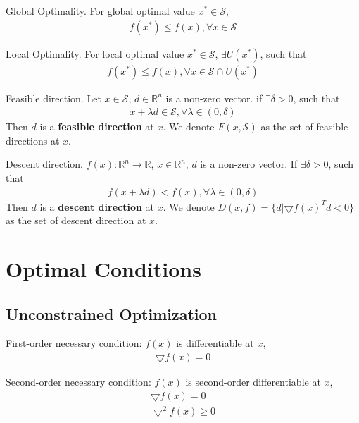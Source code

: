 \begin{definition}{Global Optimality.}
    For global optimal value $x^* \in \mathcal{S}$,
    \begin{align}
        f(x^*) \leq f(x), \forall x \in \mathcal{S}
    \end{align}
\end{definition}

\begin{definition}{Local Optimality.}
    For local optimal value $x^* \in \mathcal{S}$, $\exists U(x^*)$,
    such that
    \begin{align}
        f(x^*) \leq f(x), \forall x \in \mathcal{S} \cap U(x^*)
    \end{align}
    \end{definition}

\begin{definition}{Feasible direction.}
    Let $x \in \mathcal{S}$, $d \in \mathbb{R}^n$
    is a non-zero vector. if $\exists \delta > 0$,
    such that
    \begin{align}
        x + \lambda d \in \mathcal{S}, \forall \lambda \in (0, \delta)
    \end{align}
    Then $d$ is a \textbf{feasible direction} at $x$.
    We denote $F(x, \mathcal{S})$ as the set of feasible directions
    at $x$.
\end{definition}

\begin{definition}{Descent direction.}
    $f(x): \mathbb{R}^n \rightarrow \mathbb{R}$, $x \in \mathbb{R}^n$,
    $d$ is a non-zero vector. If $\exists \delta > 0$, such that
    \begin{align}
        f(x + \lambda d) < f(x), \forall \lambda \in (0, \delta)
    \end{align}
    Then $d$ is a \textbf{descent direction} at $x$.
    We denote $D(x, f) = \{ d | \bigtriangledown f(x)^T d < 0 \}$
    as the set of descent direction at $x$.
\end{definition}

\section{Optimal Conditions}
\subsection{Unconstrained Optimization}
\par
First-order necessary condition:
$f(x)$ is differentiable at $x$, 
\begin{align}
    \bigtriangledown f(x) = 0
\end{align}
\par
Second-order necessary condition:
$f(x)$ is second-order differentiable at $x$,
\begin{align}
    \bigtriangledown f(x) = 0 \\
    \bigtriangledown^2 f(x) \geq 0
\end{align}

